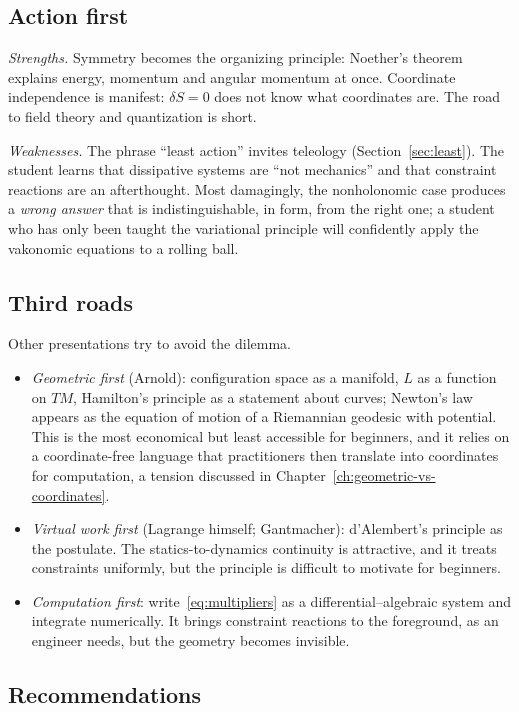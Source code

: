 \subsection{Action first}

\emph{Strengths.} Symmetry becomes the organizing principle:
Noether's theorem explains energy, momentum and angular momentum at once.
Coordinate independence is manifest: $\delta S=0$ does not know what
coordinates are. The road to field theory and quantization is short.

\emph{Weaknesses.} The phrase ``least action'' invites teleology
(Section~\ref{sec:least}). The student learns that dissipative systems are
``not mechanics'' and that constraint reactions are an afterthought. Most
damagingly, the nonholonomic case produces a \emph{wrong answer} that is
indistinguishable, in form, from the right one; a student who has only
been taught the variational principle will confidently apply the vakonomic
equations to a rolling ball.

\subsection{Third roads}

Other presentations try to avoid the dilemma.
\begin{itemize}
  \item \emph{Geometric first} (Arnold): configuration space as a manifold,
  $L$ as a function on $TM$, Hamilton's principle as a statement about
  curves; Newton's law appears as the equation of motion of a Riemannian
  geodesic with potential. This is the most economical but least
  accessible for beginners, and it relies on a coordinate-free language
  that practitioners then translate into coordinates for computation, a
  tension discussed in Chapter~\ref{ch:geometric-vs-coordinates}.
  \item \emph{Virtual work first} (Lagrange himself; Gantmacher):
  d'Alembert's principle as the postulate. The statics-to-dynamics
  continuity is attractive, and it treats constraints uniformly, but the
  principle is difficult to motivate for beginners.
  \item \emph{Computation first}: write~\eqref{eq:multipliers} as a
  differential--algebraic system and integrate numerically. It brings
  constraint reactions to the foreground, as an engineer needs, but
  the geometry becomes invisible.
\end{itemize}

\subsection{Recommendations}

